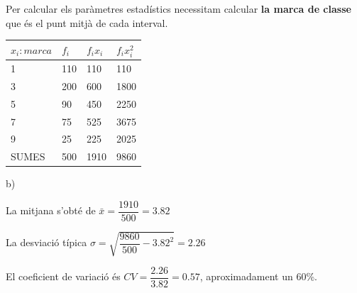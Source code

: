 \begin{resolt}
		Per calcular els paràmetres estadístics necessitam calcular \textbf{la marca de classe} que és el punt mitjà de cada interval.
		\begin{center}
			\begin{tabular}{|p{0.7in}|p{0.8in}|p{0.8in}|p{0.8in}|} \hline 
				$x_i: marca$ & $f_i$ & $f_i x_i$ & $f_i x_i^2$\\ \hline 
				1 & 110 & 110 & 110 \\ \hline 
				3 & 200 & 600 & 1800 \\ \hline 
				5 & 90 & 450 & 2250\\ \hline 
				7 & 75 & 525 & 3675 \\ \hline 
				9 & 25 & 225 & 2025 \\ \hline\hline
				\rowcolor{lightgray} SUMES & 500 & 1910 & 9860\\ \hline 
			\end{tabular}
		\end{center}	\vspace{0.24cm}
		
		b)
		\vspace{0.24cm}
		
		
		La mitjana s'obté de $\bar x = \dfrac{1910}{500}=3.82$
		
		La desviació típica  $\sigma = \sqrt{ \dfrac{9860}{500}-3.82^2 }=2.26$
		
		El coeficient de variació és $CV = \dfrac{2.26}{3.82}=0.57$, aproximadament un 60\%.
		
	\end{resolt}
	\vspace{1cm}

